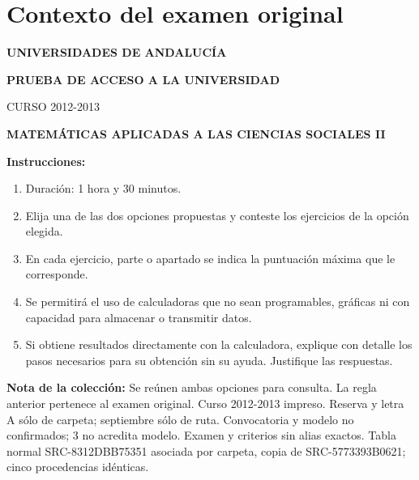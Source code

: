 \section*{Contexto del examen original}
\textbf{UNIVERSIDADES DE ANDALUCÍA}\par
\textbf{PRUEBA DE ACCESO A LA UNIVERSIDAD}\par
CURSO 2012-2013\par
\textbf{MATEMÁTICAS APLICADAS A LAS CIENCIAS SOCIALES II}

\textbf{Instrucciones:}
\begin{enumerate}[label=\textbf{\alph*)}]
  \item Duración: 1 hora y 30 minutos.
  \item Elija una de las dos opciones propuestas y conteste los ejercicios de la opción elegida.
  \item En cada ejercicio, parte o apartado se indica la puntuación máxima que le corresponde.
  \item Se permitirá el uso de calculadoras que no sean programables, gráficas ni con capacidad para almacenar o transmitir datos.
  \item Si obtiene resultados directamente con la calculadora, explique con detalle los pasos necesarios para su obtención sin su ayuda. Justifique las respuestas.
\end{enumerate}
\noindent\textbf{Nota de la colección:} Se reúnen ambas opciones para consulta. La regla anterior pertenece al examen original. Curso 2012-2013 impreso. Reserva y letra A sólo de carpeta; septiembre sólo de ruta. Convocatoria y modelo no confirmados; 3 no acredita modelo. Examen y criterios sin alias exactos. Tabla normal SRC-8312DBB75351 asociada por carpeta, copia de SRC-5773393B0621; cinco procedencias idénticas.
\par\medskip

